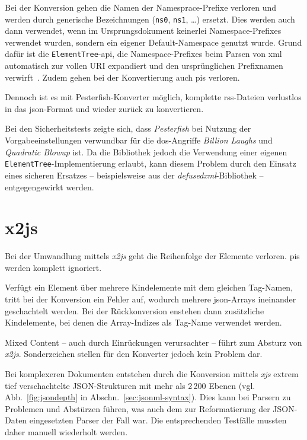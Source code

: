 Bei der Konversion gehen die Namen der Namesprace-Prefixe verloren und werden durch generische Bezeichnungen (\texttt{ns0}, \texttt{ns1}, \dots{}) ersetzt. Dies werden auch dann verwendet, wenn im Ursprungsdokument keinerlei Namespace-Prefixes verwendet wurden, sondern ein eigener Default-Namespace genutzt wurde. Grund dafür ist die \texttt{Element}\-\texttt{Tree}-\acrshort{api}, die Namespace-Prefixes beim Parsen von \acrshort{xml} automatisch zur vollen URI expandiert und den ursprünglichen Prefixnamen verwirft~\cite[Abschn.~20.5.1.7]{pythonetreexmlns}.
Zudem gehen bei der Konvertierung auch \glspl{pi} verloren.

Dennoch ist es mit Pesterfish-Konverter möglich, komplette \acrshort{rss}-Dateien verlustlos in das \acrshort{json}-Format und wieder zurück zu konvertieren.

Bei den Sicherheitstests zeigte sich, dass \emph{Pesterfish} bei Nutzung der Vorgabeeinstellungen verwundbar für die \acrshort{dos}-Angriffe \emph{Billion Laughs} und \emph{Quadratic Blowup} ist. Da die Bibliothek jedoch die Verwendung einer eigenen \texttt{ElementTree}-Implementierung erlaubt, kann diesem Problem durch den Einsatz eines sicheren Ersatzes -- beispielsweise aus der \emph{defusedxml}-Bibliothek -- entgegengewirkt werden.

\section{x2js}
\label{sec:x2js}

Bei der Umwandlung mittels \emph{x2js} geht die Reihenfolge der Elemente verloren. \glspl{pi} werden komplett ignoriert.

Verfügt ein Element über mehrere Kindelemente mit dem gleichen Tag-Namen, tritt bei der Konversion ein Fehler auf, wodurch mehrere \acrshort{json}-Arrays ineinander geschachtelt werden. Bei der Rückkonversion enstehen dann zusätzliche Kindelemente, bei denen die Array-Indizes als Tag-Name verwendet werden.

Mixed Content -- auch durch Einrückungen verursachter -- führt zum Absturz von \emph{x2js}. Sonderzeichen stellen für den Konverter jedoch kein Problem dar.

Bei komplexeren Dokumenten entstehen durch die Konversion mittels \emph{xjs} extrem tief verschachtelte JSON-Strukturen mit mehr als 2\,200 Ebenen (vgl. Abb.~\ref{fig:jsondepth} in Abschn.~\ref{sec:jsonml-syntax}). Dies kann bei Parsern zu Problemen und Abstürzen führen, was auch dem zur Reformatierung der JSON-Daten eingesetzten Parser der Fall war. Die entsprechenden Testfälle mussten daher manuell wiederholt werden.

